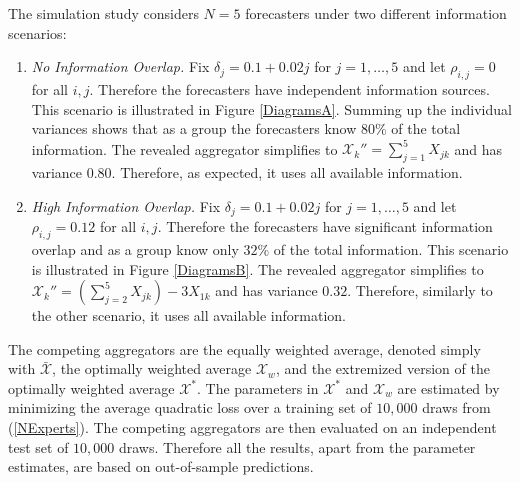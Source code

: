 \documentclass[11pt]{article}
\theoremstyle{definition}
\theoremstyle{definition}
\begin{document}
The simulation study considers $N = 5$ forecasters under two different information scenarios: 
\begin{enumerate}
\item[] \textit{No Information Overlap.}  Fix $\delta_j = 0.1 + 0.02j$ for $j = 1, \dots, 5$ and let $\rho_{i,j} = 0$ for all $i,j$. Therefore the forecasters have independent information sources. This scenario is illustrated in Figure \ref{DiagramsA}. Summing up the individual variances shows that as a group the forecasters know $80\%$ of the total information. The revealed aggregator simplifies to $\mathcal{X}_k'' = \sum_{j=1}^5 X_{jk}$ and has variance $0.80$. Therefore, as expected, it uses all available information.


\item[] \textit{High Information Overlap.} Fix $\delta_j = 0.1 + 0.02j$ for $j = 1, \dots, 5$ and let $\rho_{i,j} = 0.12$ for all $i,j$. Therefore the forecasters have significant information overlap and as a group know only $32\%$ of the total information. This scenario is illustrated in Figure \ref{DiagramsB}. The revealed aggregator simplifies to $ \mathcal{X}_k'' = \left( \sum_{j=2}^5 X_{jk} \right) - 3X_{1k}$ and has variance $0.32$. Therefore, similarly to the other scenario, it uses all available information.
\end{enumerate}


The competing aggregators are the equally weighted average, denoted simply with $\bar{\mathcal{X}}$, the optimally weighted average $\mathcal{X}_w$, and the extremized version of the optimally weighted average $\mathcal{X}^*$. The parameters in $\mathcal{X}^*$ and  $\mathcal{X}_w$ are estimated by minimizing the average quadratic loss over a training set of $10,000$ draws from (\ref{NExperts}).  
The competing aggregators are then evaluated on an independent test set of $10,000$ draws. Therefore all the results, apart from the parameter estimates, are based on out-of-sample predictions. 
\end{document}
